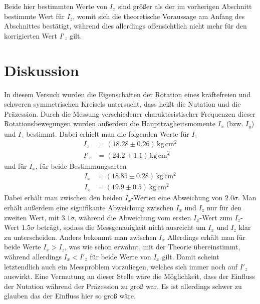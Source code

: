 \documentclass[12pt,a4paper,german]{scrartcl}
\numberwithin{equation}{section}
\begin{document}
  Beide hier bestimmten Werte von $I_x$ sind größer als der im vorherigen Abschnitt bestimmte Wert für $I_z$, womit sich die theoretische Voraussage am Anfang des Abschnittes bestätigt, während dies allerdings offensichtlich nicht mehr für den korrigierten Wert $I'_z$ gilt.

  \newpage
  \section{Diskussion}
  In diesem Versuch wurden die Eigenschaften der Rotation eines kräftefreien und schweren symmetrischen Kreisels untersucht, dass heißt die Nutation und die Präzession.
  Durch die Messung verschiedener charakteristischer Frequenzen dieser Rotationsbewegungen wurden außerdem die Hauptträgheitsmomente $I_x$ (bzw. $I_y$) und $I_z$ bestimmt.
  Dabei erhielt man die folgenden Werte für $I_z$
  \begin{align}
    I_z &= (18.28 \pm 0.26) \, \text{kg} \, \text{cm}^2 \nonumber \\
    I'_z &= (24.2 \pm 1.1) \, \text{kg} \, \text{cm}^2
  \end{align}
  und für $I_x$, für beide Bestimmungsarten
  \begin{align}
    I_x &= (18.85 \pm 0.28) \, \text{kg} \, \text{cm}^2 \nonumber \\
    I_x &= (19.9 \pm 0.5) \, \text{kg} \, \text{cm}^2
  \end{align}
  Dabei erhält man zwischen den beiden $I_x$-Werten eine Abweichung von $2.0\sigma$. Man erhält außerdem eine signifikante Abweichung zwischen $I_x$ und $I_z$ nur für den zweiten Wert, mit $3.1\sigma$, während die Abweichung vom ersten $I_x$-Wert zum $I_z$-Wert $1.5\sigma$ beträgt, sodass die Messgenauigkeit nicht ausreicht um $I_x$ und $I_z$ klar zu unterscheiden.
  Anders bekommt man zwischen $I_x$
  Allerdings erhält man für beide Werte $I_x > I_z$, was wie schon erwähnt, mit der Theorie übereinstimmt, während allerdings $I_x < I'_z$ für beide Werte von $I_x$ gilt.
  Damit scheint letztendlich auch ein Messproblem vorzuliegen, welches sich immer noch auf $I'_z$ auswirkt.
  Eine Vermutung an dieser Stelle wäre die Möglichkeit, dass der Einfluss der Nutation während der Präzession zu groß war.
  Es ist allerdings schwer zu glauben das der Einfluss hier so groß wäre.
\end{document}
